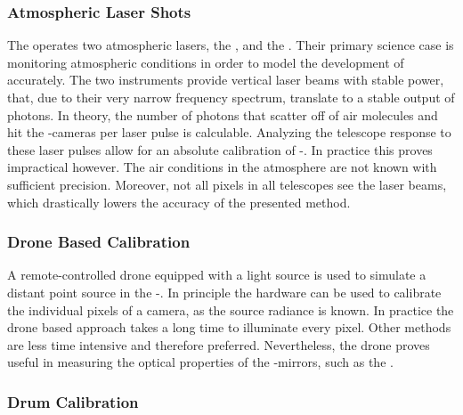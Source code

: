 \subsubsection{Atmospheric Laser Shots}

The \PAO operates two atmospheric lasers, the \CLF, and the \XLF 
\cite{collaborationTechniquesMeasuringAerosol2013}. Their primary science case 
is monitoring atmospheric conditions in order to model the development of \EASs
accurately. The two instruments provide vertical laser beams with stable power,
that, due to their very narrow frequency spectrum, translate to a stable
output of photons. In theory, the number of photons that scatter off of air 
molecules and hit the \FD-cameras per laser pulse is calculable. Analyzing the
telescope response to these laser pulses allow for an absolute calibration of 
\FD-\PMTs. In practice this proves impractical however. The air conditions in 
the atmosphere are not known with sufficient precision. Moreover, not all
pixels in all telescopes see the laser beams, which drastically lowers the 
accuracy of the presented method.

\subsubsection{Drone Based Calibration}

A remote-controlled drone equipped with a light source is used to simulate a 
distant point source in the \FD-\FOV \cite{wernerDesignTestFlying2010, 
tomankovaOpticalPropertiesCalibration2016}. In principle the hardware can be
used to calibrate the individual pixels of a camera, as the source radiance is
known. In practice the drone based approach takes a long time to illuminate 
every pixel. Other methods are less time intensive and therefore preferred. 
Nevertheless, the drone proves useful in measuring the optical properties of 
the \FD-mirrors, such as the \PSF \cite{ungerSimulationPointSpread2013}.

\subsubsection{Drum Calibration}

